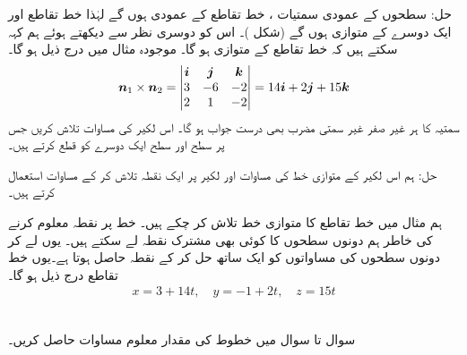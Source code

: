 حل:\quad
سطحوں کے عمودی سمتیات ،      خط تقاطع کے  عمودی ہوں  گے  لہٰذا خط تقاطع اور   ایک دوسرے کے  متوازی ہوں  گے (شکل )۔ اس کو دوسری نظر سے دیکھتے ہوئے ہم کہہ سکتے ہیں کہ   خط تقاطع کے متوازی ہو گا۔ موجودہ مثال میں درج ذیل ہو گا۔
\begin{align*}
{\ensuremath{{\boldsymbol{n}}}}_1\times{\ensuremath{{\boldsymbol{n}}}}_2=\begin{vmatrix}{\boldsymbol{i}}&{\boldsymbol{j}}&{\boldsymbol{k}}\\3&-6&-2\\2&1&-2\end{vmatrix}=14{\boldsymbol{i}}+2{\boldsymbol{j}}+15{\boldsymbol{k}}
\end{align*}
سمتیہ  کا ہر غیر صفر غیر سمتی مضرب بھی درست جواب ہو گا۔
اس لکیر کی مساوات تلاش کریں جس پر سطح  اور سطح  ایک دوسرے کو قطع کرتے ہیں۔

حل:\quad
ہم اس لکیر کے متوازی خط کی مساوات اور  لکیر پر ایک نقطہ  تلاش کر کے   مساوات  استعمال کرتے ہیں۔

ہم مثال  میں  خط  تقاطع کا متوازی خط   تلاش کر چکے ہیں۔ خط پر نقطہ معلوم کرنے کی خاطر  ہم دونوں سطحوں کا  کوئی بھی مشترک نقطہ لے سکتے ہیں۔ یوں  لے کر دونوں سطحوں کی مساواتوں کو ایک ساتھ حل کر کے نقطہ  حاصل ہوتا ہے۔یوں خط تقاطع درج ذیل ہو گا۔
\begin{align*}
x=3+14t,\quad y=-1+2t,\quad z=15t
\end{align*}

\\
سوال  تا  سوال    میں خطوط کی مقدار معلوم مساوات حاصل کریں۔

